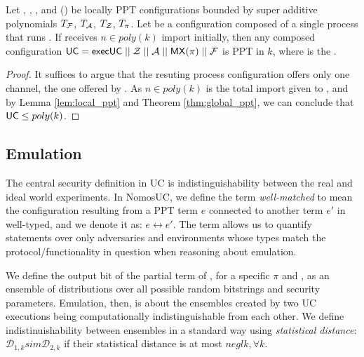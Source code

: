 \begin{theorem} \label{thm:soundness}
Let \F, \A, \Z, and (\PI) be locally PPT configurations bounded by super additive polynomials $T_\mathcal{F}$, $T_\mathcal{A}$, $T_\mathcal{Z}$, $T_\pi$. Let  be a configuration composed of a single process that runs . If  receives $n \in poly(k)$ import initially, then any composed configuration $\mathsf{UC} = \mathsf{execUC} \; || \; \mathcal{Z} \; || \; \mathcal{A} \; || \; \mathsf{MX}(\pi) \; || \; \mathcal{F}$ is PPT in $k$, where  is the \partywrapper.
\end{theorem}

\begin{proof}
It suffices to argue that the resuting process configuration  offers only one channel, the one offered by .
As $n \in poly(k)$ is the total import given to , and by Lemma \ref{lem:local_ppt} and Theorem \ref{thm:global_ppt}, we can conclude that $\mathsf{UC} \leq poly(k)$.
\end{proof}

\subsection{Emulation}
The central security definition in UC is indistinguishability between the real and ideal world experiments.
In NomosUC, we define the term \textit{well-matched} to mean the configuration resulting from a PPT term $e$ connected to another term $e'$ in well-typed, and we denote it as: $e \leftrightarrow e'$.
The term allows us to quantify statements over only adversaries and environments whose types match the protocol/functionality in question when reasoning about emulation. 

We define the output bit of the partial term of , for a specific $\pi$ and \F, as an ensemble of distributions over all possible random bitstrings and security parameters.
Emulation, then, is about the ensembles created by two UC executions being computationally indistinguishable from each other.
We define indistinuishability between ensembles in a standard way using \textit{statistical distance}: $\mathcal{D}_{1,k} sim \mathcal{D}_{2,k}$ if their statistical distance is at most $negl{k}, \forall k$.

